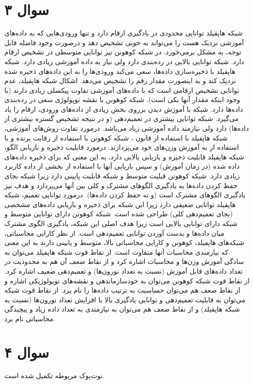 \documentclass[12pt]{article}
\begin{document}
\section{سوال ۳}
شبکه هاپقیلد توانایی محدودی در یادگیری ارقام دارد و تنها ورودی‌هایی که به داده‌های آموزشی نزدیک هست را می‌تواند به خوبی تشخیص دهد و درصورت وجود فاصله قابل توجه، به مشکل برمی‌خورد. در شبکه کوهونن نیز توانایی متوسطی در تشخیص ارقام دارد. شبکه  توانایی بالایی در رده‌بندی  دارد ولی نیاز به داده آموزشی زیادی دارد.
\newline
شبکه هاپفیلد با ذخیره‌سازی داده‌ها، سعی می‌کند ورودی‌ها را به این داده‌های ذخیره شده نزدیک کند و به اینصورت مقدار رقم را تشخیص می‌دهد. اشکال شبکه هاپفیلد، عدم توانایی تشخیص ارقامی است که با داده‌های آموزشی تفاوت پیکسلی زیادی دارند (با وجود اینکه مقدار آنها یکی است). شبکه کوهونن با نقشه توپولوژی سعی در رده‌بندی داده‌ها دارد. شبکه  با آموزش دیدن برروی بخش زیادی از داده‌های ورودی، ارقام را یاد می‌گیرد. شبکه  توانایی بیشتری در تعمیم‌دهی (و در نتیجه تشخیص گستره  بیشتری از داده‌ها) دارد ولی نیازمند داده آموزشی زیاد می‌باشد.
\newline
درمورد تفاوت روش‌های آموزشی، شبکه هاپفیلد با استفاده از قانون ، شبکه کوهونن با استفاده از رقابت برنده و  با استفاده از  به آموزش وزن‌های خود می‌پردازند. درمورد قابلیت ذخیره و بازیابی الگو، شبکه هاپفیلد قابلیت ذخیره و بازیابی بالایی دارد، به این معنی که برای ذخیره داده‌های داده شده (در زمان آموزش) و سپس بازیابی آنها با استفاده از بخشی از داده کاربرد زیادی دارد. شبکه کوهونن قبلیت متوسط و شبکه  قابلیت پایینی دارد زیرا شبکه  بجای حفظ کردن داده‌ها به یادگیری الگوهای مشترک و کلی بین آنها می‌پردازد و هدف نیز یادگیری الگوهای مشترک است (و نه حفظ کردن داده‌ها). درمورد توانایی تعمیم، شبکه هاپفیلد توانایی ضعیفی دارد زیرا این شبکه برای ذخیره و بازیابی داده‌های مشخصی (بجای تعمیم‌دهی کلی) طراحی شده است. شبکه کوهونن دارای توانایی متوسط و شبکه  دارای توانایی بالایی است زیرا هدف اصلی این شبکه، یادگیری الگوی مشترک میان داده‌ها و بدست آوردن توانایی تعمیم‌دهی است. از نظر کارایی محاسباتی، شبکه‌های هاپفیلد، کوهونن و  کارایی محاسباتی بالا، متوسط و پایینی دارند به این معنی که نیازمندی محاسبات آنها متفاوت است. از نقاط قوت شبکه هاپفیلد می‌توان به سادگی آموزش وزن‌ها و محاسبات اشاره کرد و از نقاط ضعف آن هم به محدودیت در تعداد داده‌های قابل آموزش (نسبت به تعداد نورون‌ها) و تعمیم‌دهی ضعیف اشاره کرد. از نقاط قوت شبکه کوهونن می‌توان به خودسازماندهی و نقشه‌های توپولوژیکی اشاره و از نقاط صعف هم می‌توان حساسیت به ترتیب داده‌ها را نام برد. از نقاط قوت شبکه  می‌توان به قابلیت تعمیم‌دهی و توانایی یادگیری بالا با افزایش تعداد نورون‌ها (نسبت به شبکه هاپفیلد) و از نقاط ضعف هم می‌توان به نیازمندی به تعداد داده زیاد و پیچیدگی محاسباتی نام برد.
\section{سوال ۴}
نوت‌بوک مربوطه تکمیل شده است.
\end{document}
